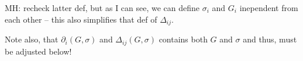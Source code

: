 \documentclass[final,3p,times]{elsarticle}
\newtheorem{example}{Example}[section]
\newcommand{\TODO}[1]{\begingroup\color{red}#1\endgroup}
\newcommand{\OLD}[1]{\begingroup\tiny\color{gray}#1\endgroup}
\newcommand{\mh}[1]{\begingroup\color{blue}#1\endgroup}
\begin{document}
\TODO{MH: recheck latter def, but as I can see, we can define $\sigma_i$ and $G_i$
inependent from each other -- this also simplifies that def of $\Delta_{ij}$. 

Note also, that $\partial_i(G,\sigma)$ and $\Delta_{ij}(G,\sigma)$
contains both $G$ and $\sigma$ and thus, must be adjusted below!
}






\end{document}
